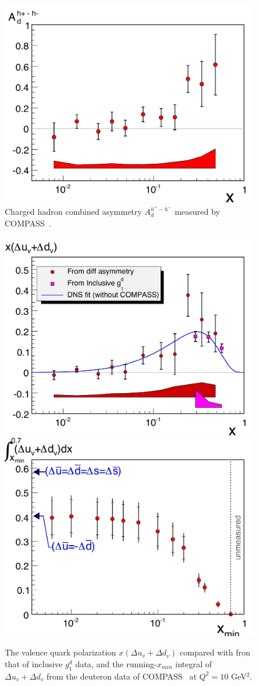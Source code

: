 \begin{figure}[tbhp]
\centerline{
\includegraphics[width=0.70\linewidth]{figs_xj/compass_korzenev_Adiff.pdf}
}
\caption{\label{fig:compass2} Charged hadron combined asymmetry $A_d^{h^+ - h^-}$ measured by COMPASS~\protect\cite{compass2007}.
}
\end{figure}

\begin{figure}[tbhp]
\centerline{
\includegraphics[width=0.50\linewidth]{figs_xj/compass_korzenev_udv.pdf}
\includegraphics[width=0.50\linewidth]{figs_xj/compass_korzenev_int.pdf}
}
\caption{\label{fig:compass3} The valence
quark polarization $x(\Delta u_v + \Delta d_v)$ compared with fron that of inclusive $g_1^d$ data, and the running-$x_{min}$ 
integral of $\Delta u_v + \Delta d_v$ from the deuteron data of COMPASS~\protect\cite{compass2007} at $Q^2=10$ GeV$^2$.
}
\end{figure}

